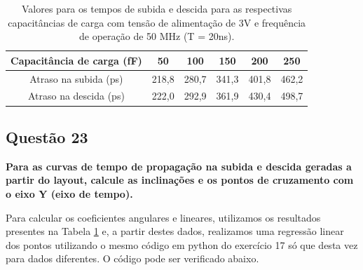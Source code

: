 \documentclass[12pt,a4paper]{article}
\begin{document}
\begin{table}[H]
    \centering
    \caption{Valores para os tempos de subida e descida para as respectivas capacitâncias de carga com tensão de alimentação de 3V e frequência de operação de 50 MHz (T = 20ns).}
    \label{tab:inverter_delay_values}
    \begin{tabular}{cccccc}
        \toprule
        Capacitância de carga (fF) & 50 & 100 & 150 & 200 & 250 \\
        \midrule
        Atraso na subida (ps) & 218,8 & 280,7 & 341,3 & 401,8 & 462,2 \\
        Atraso na descida (ps) & 222,0 & 292,9 & 361,9 & 430,4 & 498,7 \\
        \bottomrule
    \end{tabular}
\end{table}

\subsection*{Questão 23}

	\textbf{Para as curvas de tempo de propagação na subida e descida geradas a partir do layout, calcule as inclinações e os pontos de cruzamento com o eixo Y (eixo de tempo).}

Para calcular os coeficientes angulares e lineares, utilizamos os resultados presentes na Tabela \ref{tab:inverter_delay_values} e, a partir destes dados, realizamos uma regressão linear dos pontos utilizando o mesmo código em python do exercício 17 só que desta vez para dados diferentes. O código pode ser verificado abaixo.
\end{document}
